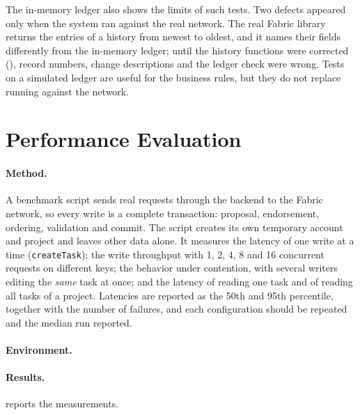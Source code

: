 The in-memory ledger also shows the limits of such tests. Two defects appeared only when the system ran against the real network. The real Fabric library returns the entries of a history from newest to oldest, and it names their fields differently from the in-memory ledger; until the history functions were corrected (), record numbers, change descriptions and the ledger check were wrong. Tests on a simulated ledger are useful for the business rules, but they do not replace running against the network.

\section{Performance Evaluation}
\label{sec:results-performance}

\paragraph{Method.} A benchmark script sends real requests through the backend to the Fabric network, so every write is a complete transaction: proposal, endorsement, ordering, validation and commit. The script creates its own temporary account and project and leaves other data alone. It measures the latency of one write at a time (\texttt{createTask}); the write throughput with 1, 2, 4, 8 and 16 concurrent requests on different keys; the behavior under contention, with several writers editing the \emph{same} task at once; and the latency of reading one task and of reading all tasks of a project. Latencies are reported as the 50th and 95th percentile, together with the number of failures, and each configuration should be repeated and the median run reported.

\paragraph{Environment.} 

\paragraph{Results.}  reports the measurements.

